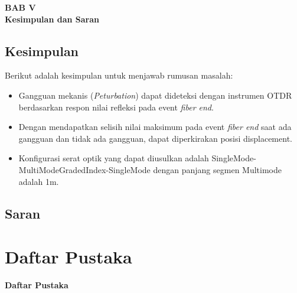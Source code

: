 \documentclass[12pt]{article}
\begin{document}
\begin{center}
	{\large \textbf{BAB V}} \\
	{\large \textbf{Kesimpulan dan Saran}}
\end{center}

\subsection{Kesimpulan}

Berikut adalah kesimpulan untuk menjawab rumusan masalah:

\begin{itemize}
	\item Gangguan mekanis (\textit{Peturbation}) dapat dideteksi dengan instrumen OTDR berdasarkan respon nilai refleksi pada event \textit{fiber end}.
	\item Dengan mendapatkan selisih nilai maksimum pada event \textit{fiber end} saat ada gangguan dan tidak ada gangguan, dapat diperkirakan posisi displacement.
	\item Konfigurasi serat optik yang dapat diusulkan adalah SingleMode-MultiModeGradedIndex-SingleMode dengan panjang segmen Multimode adalah 1m.
\end{itemize}
	
\subsection{Saran}


\newpage
\thispagestyle{empty}
\mbox{}

\newpage

	\section{Daftar Pustaka}
	
	\begin{center}
		\textbf{Daftar Pustaka}
	\end{center}
	
	
	

	
\end{document}
